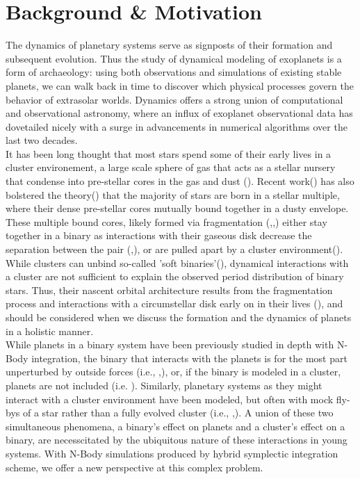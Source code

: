 \documentclass{aastex631}
\begin{document}
\section{Background \& Motivation}
\indent The dynamics of planetary systems serve as signposts of their formation and subsequent evolution. Thus the study of dynamical modeling 
of exoplanets is a form of archaeology: using both observations and simulations of existing stable planets, we can walk back in 
time to discover which physical processes govern the behavior of extrasolar worlds.  Dynamics offers a strong union of computational 
and observational astronomy, where an influx of exoplanet observational data has dovetailed nicely with a surge in advancements in numerical algorithms
over the last two decades. \\
\indent It has been long thought that most stars spend some of their early lives in a cluster environement, a large scale sphere of gas that acts as a stellar nursery
 that condense into pre-stellar cores in the gas and dust (\cite{lad03}). Recent work(\cite{sad17}) has also bolstered the theory(\cite{kro95}) that the majority of stars 
 are born in a stellar multiple, where their dense pre-stellar cores mutually bound together in a dusty envelope. 
 These multiple bound cores, likely formed
 via fragmentation (\cite{bon94},\cite{bat03},\cite{tur09}) either stay together in a binary as interactions with their gaseous
 disk decrease the separation between the pair (\cite{bat00},\cite{bat03}), or are pulled apart by a cluster environment(\cite{kro01}). 
 While clusters can unbind so-called 'soft binaries'(\cite{kro01}), dynamical interactions with a cluster are not sufficient to explain the observed
 period distribution of binary stars. Thus, their nascent orbital architecture results from the fragmentation process and interactions with a circumstellar disk
 early on in their lives (\cite{krobur01}), and should be considered when we discuss the formation and the dynamics of planets in a holistic manner.\\
 \indent While planets in a binary system have been 
 previously studied in depth with N-Body integration, the binary that interacts with the planets is for the most part unperturbed by outside forces 
 (i.e., \cite{hol99},\cite{hag07}),
 or, if the binary is modeled in a cluster, planets are not included (i.e. \cite{krobur01}). Similarly, planetary systems as they might interact with a cluster environment
 have been modeled, but often with mock fly-bys of a star rather than a fully evolved cluster (i.e., \cite{rec09},\cite{cat20}). A union of these two simultaneous phenomena,
 a binary's effect on planets and a cluster's effect on a binary, are necesscitated by the ubiquitous nature of these interactions in young systems. With N-Body simulations
 produced by hybrid symplectic integration scheme, we offer a new perspective at this complex problem. 
\end{document}
